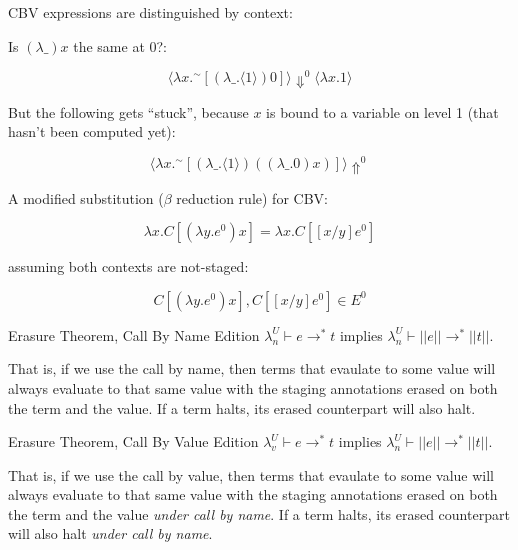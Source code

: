\documentclass{beamer}
\begin{document}
\begin{frame}{CBV expressions are distinguished by context:}

Is $(\lambda\_) x$ the same at $0$?:

\begin{equation*}
\langle \lambda x.^\sim [(\lambda\_.\langle 1 \rangle) 0] \rangle
\Downarrow^0 \langle \lambda x.1 \rangle
\end{equation*}


But the following gets ``stuck'', because $x$ is bound to a variable
on level 1 (that hasn't been computed yet):

\begin{equation*}
\langle \lambda x.^\sim [(\lambda\_.\langle 1 \rangle)
 ((\lambda\_.0) 
 x)] \rangle \Uparrow^0
\end{equation*}

\end{frame}

\begin{frame}

A modified substitution ($\beta$ reduction rule) for CBV:

\begin{equation*}
\lambda x.C[(\lambda y.e^0) x] = \lambda x.C[[x/y]e^0]
\end{equation*}

assuming both contexts are not-staged:

\begin{equation*}
C[(\lambda y.e^0) x], C[[x/y]e^0]  \in E^0
\end{equation*}

\end{frame}


\begin{frame}{Erasure Theorem, Call By Name Edition}
$\lambda _n ^U \vdash e \rightarrow ^* t$ implies $\lambda _n ^U \vdash ||e|| \rightarrow ^* ||t||$.\\
\vspace{1cm} 

That is, if we use the call by name, then terms that evaulate to some
value will always evaluate to that same value with the staging
annotations erased on both the term and the value. If a term halts,
its erased counterpart will also halt.
\end{frame}

\begin{frame}{Erasure Theorem, Call By Value Edition}
$\lambda _v ^U \vdash e \rightarrow ^* t$ implies $\lambda _n ^U \vdash ||e|| \rightarrow ^* ||t||$.\\
\vspace{1cm}

That is, if we use the call by value, then terms that evaulate to some
value will always evaluate to that same value with the staging
annotations erased on both the term and the value \textit{under call
  by name}. If a term halts, its erased counterpart will also halt
\textit{under call by name}.
\end{frame}
\end{document}

